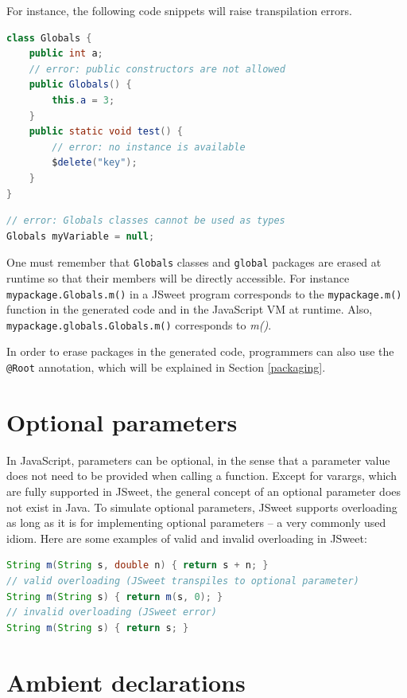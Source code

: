 \documentclass[a4paper]{report}
\begin{document}
For instance, the following code snippets will raise transpilation errors.

\begin{lstlisting}[language=Java]
class Globals {
	public int a;
	// error: public constructors are not allowed
	public Globals() {
		this.a = 3;
	}
	public static void test() {
		// error: no instance is available
		$delete("key");
	}
}
\end{lstlisting}

\begin{lstlisting}[language=Java]
// error: Globals classes cannot be used as types
Globals myVariable = null;
\end{lstlisting}

One must remember that \texttt{Globals} classes and \texttt{global} packages are erased at runtime so that their members will be directly accessible. For instance \texttt{mypackage.Globals.m()} in a JSweet program corresponds to the \texttt{mypackage.m()} function in the generated code and in the JavaScript VM at runtime. Also, \texttt{mypackage.globals.Globals.m()} corresponds to \emph{m()}.

In order to erase packages in the generated code, programmers can also use the \texttt{@Root} annotation, which will be explained in Section \ref{packaging}.

\section{Optional parameters} 
\label{optional-parameters}

In JavaScript, parameters can be optional, in the sense that a parameter value does not need to be provided when calling a function. Except for varargs, which are fully supported in JSweet, the general concept of an optional parameter does not exist in Java. To simulate optional parameters, JSweet supports overloading as long as it is for implementing optional parameters -- a very commonly used idiom. Here are some examples of valid and invalid overloading in JSweet:

\begin{lstlisting}[language=Java]
String m(String s, double n) { return s + n; }
// valid overloading (JSweet transpiles to optional parameter)
String m(String s) { return m(s, 0); }
// invalid overloading (JSweet error)
String m(String s) { return s; }
\end{lstlisting}

\section{Ambient declarations}
\end{document}
